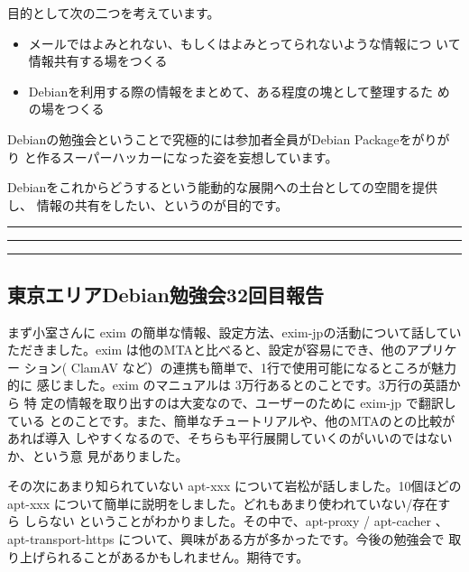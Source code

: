 \documentclass[mingoth,a4paper]{jsarticle}
\begin{document}
 目的として次の二つを考えています。

 \begin{itemize}
 \item メールではよみとれない、もしくはよみとってられないような情報につ
       いて情報共有する場をつくる
 \item Debianを利用する際の情報をまとめて、ある程度の塊として整理するた
       めの場をつくる
 \end{itemize}

 Debianの勉強会ということで究極的には参加者全員がDebian Packageをがりがり
 と作るスーパーハッカーになった姿を妄想しています。

 Debianをこれからどうするという能動的な展開への土台としての空間を提供し、
 情報の共有をしたい、というのが目的です。


\newpage

\begin{minipage}[b]{0.2\hsize}
 \colorbox{dancerlightblue}{}
\end{minipage}
\begin{minipage}[b]{0.8\hsize}
\hrule
\vspace{2mm}
\hrule
\setcounter{tocdepth}{2}
\tableofcontents
\vspace{2mm}
\hrule
\end{minipage}


\subsection{東京エリアDebian勉強会32回目報告}

まず小室さんに exim の簡単な情報、設定方法、exim-jpの活動について話してい
ただきました。exim は他のMTAと比べると、設定が容易にでき、他のアプリケー
ション( ClamAV など）の連携も簡単で、1行で使用可能になるところが魅力的に
感じました。exim のマニュアルは 3万行あるとのことです。3万行の英語から 特
定の情報を取り出すのは大変なので、ユーザーのために exim-jp で翻訳している
とのことです。また、簡単なチュートリアルや、他のMTAのとの比較があれば導入
しやすくなるので、そちらも平行展開していくのがいいのではないか、という意
見がありました。

その次にあまり知られていない apt-xxx について岩松が話しました。10個ほどの
apt-xxx について簡単に説明をしました。どれもあまり使われていない/存在すら
しらない ということがわかりました。その中で、apt-proxy / apt-cacher 、
apt-transport-https について、興味がある方が多かったです。今後の勉強会で
取り上げられることがあるかもしれません。期待です。
\end{document}
